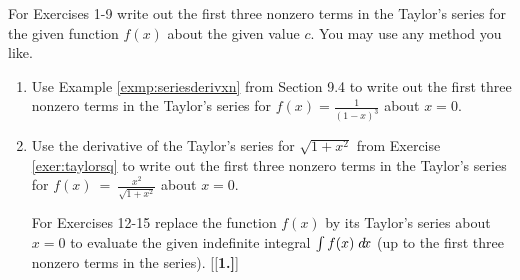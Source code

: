 \divider
\vspace{2mm}
\startexercises\label{sec9dot5}
{\small
{}
\par\noindent For Exercises 1-9 write out the first three nonzero terms in the
Taylor's series for the given function $f(x)$ about the given value $c$. You may
use any method you like.
\begin{enumerate}[\bfseries 1.]
 \item Use Example \ref{exmp:seriesderivxn} from Section 9.4 to write out the
  first three nonzero terms in the Taylor's series for
  $f(x) = \frac{1}{(1 - x)^3}$ about $x=0$.
 \item Use the derivative of the Taylor's series for $\sqrt{1 + x^2}$ from
  Exercise \ref{exer:taylorsq} to write out the first three nonzero terms in the
  Taylor's series for $f(x) ~=~ \frac{x^2}{\sqrt{1 + x^2}}$ about $x=0$.
\par\noindent For Exercises 12-15 replace the function $f(x)$ by its Taylor's
 series about $x=0$ to evaluate the given indefinite integral $\int f(x) \;d\!x$
 (up to the first three nonzero terms in the series).
[{[\bfseries 1.]}]
\end{enumerate}}
